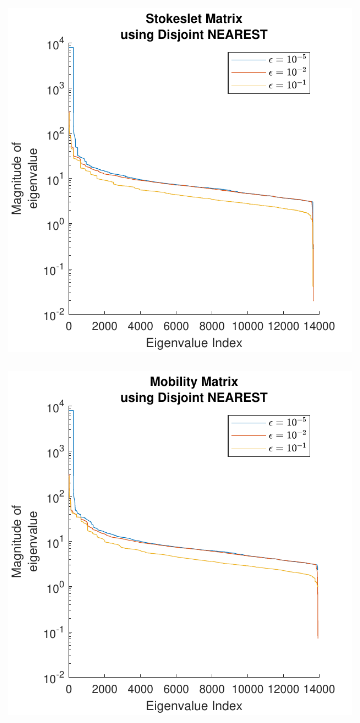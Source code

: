 \begin{figure}
\ContinuedFloat
    \begin{subfigure}{0.45\textwidth}
        \centering
        \includegraphics[width=\linewidth]{Images/Condition/Eigen-Stokeslet Matrix using Disjoint NEAREST.pdf}
    \end{subfigure}
    \hfill
    \begin{subfigure}{0.45\textwidth}
        \centering
        \includegraphics[width=\linewidth]{Images/Condition/Eigen-Mobility Matrix using Disjoint NEAREST.pdf}
    \end{subfigure}
\end{figure}

